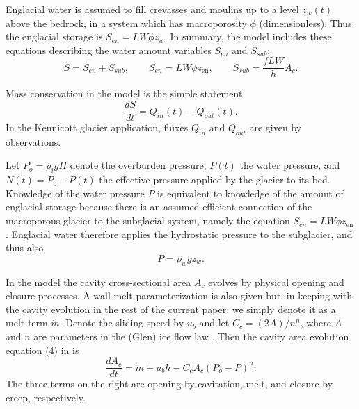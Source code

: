 \documentclass[11pt,final]{amsart}
\newcommand{\zen}{z_{\text{en}}}
\begin{document}
Englacial water is assumed to fill crevasses and moulins up to a level $z_w(t)$ above the bedrock, in a system which has macroporosity $\phi$ (dimensionless).  Thus the englacial storage is $S_{en}=L W \phi z_w$.  In summary, the \cite{Bartholomausetal2011} model includes these equations describing the water amount variables $S_{en}$ and $S_{sub}$:
\begin{equation}
S = S_{en} + S_{sub}, \qquad S_{en} = L W \phi \zen, \qquad S_{sub} = \frac{f L W}{h} A_c.  \label{eq:barth:kinematics}
\end{equation}

Mass conservation in the model is the simple statement  \citep{Bartholomausetal2008}
\begin{equation}
\frac{dS}{dt} = Q_{in}(t) - Q_{out}(t). \label{eq:barth:massconserve}
\end{equation}
In the Kennicott glacier application, fluxes $Q_{in}$ and $Q_{out}$ are given by observations.

Let $P_o=\rho_i g H$ denote the overburden pressure, $P(t)$ the water pressure, and $N(t)=P_o-P(t)$ the effective pressure applied by the glacier to its bed.  Knowledge of the water pressure $P$ is equivalent to knowledge of the amount of englacial storage because there is an assumed efficient connection of the macroporous glacier to the subglacial system, namely the equation $S_{en}=L W \phi \zen$.  Englacial water therefore applies the hydrostatic pressure to the subglacier, and thus also
\begin{equation}
P = \rho_w g z_w.  \label{eq:barth:englacialpressure}
\end{equation}

In the \cite{Bartholomausetal2011} model the cavity cross-sectional area $A_c$ evolves by physical opening and closure processes.  A wall melt parameterization is also given but, in keeping with the cavity evolution in the rest of the current paper, we simply denote it as a melt term $\dot m$.  Denote the sliding speed by $u_b$ and let $C_c = (2 A)/n^n$, where $A$ and $n$ are parameters in the (Glen) ice flow law \citep{Paterson}.  Then the cavity area evolution equation (4) in \cite{Bartholomausetal2011} is
\begin{equation}
\frac{dA_c}{dt} = \dot m + u_b h - C_c A_c (P_o-P)^n.  \label{eq:barth:cavityevolution}
\end{equation}
The three terms on the right are opening by cavitation, melt, and closure by creep, respectively.
\end{document}
